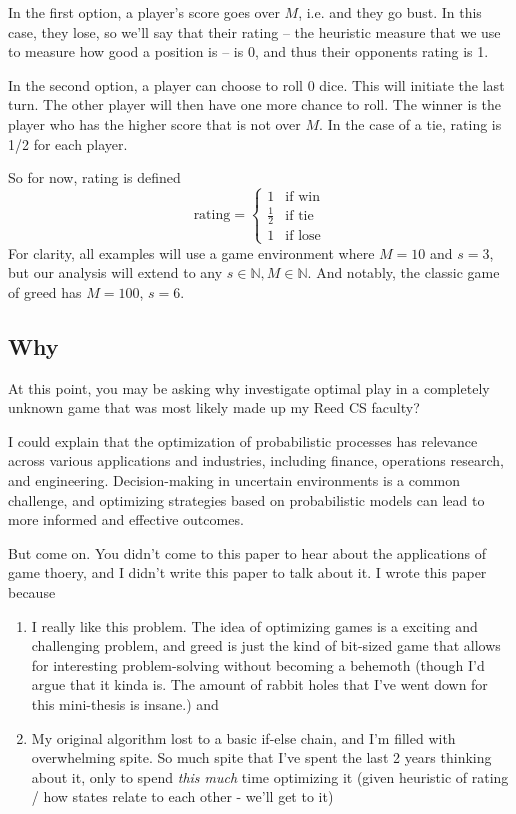 \documentclass[a4paper]{article}
\begin{document}
In the first option, a player's score goes over $M$, i.e. and they go bust. In this case, they lose, so we'll say that their rating -- the heuristic measure that we use to measure how good a position is -- is 0, and thus their opponents rating is 1. 

In the second option, a player can choose to roll 0 dice. This will initiate the last turn. The other player will then have one more chance to roll. The winner is the player who has the higher score that is not over $M$. In the case of a tie, rating is 1/2 for each player. 

So for now, rating is defined
%
$$
\text{rating} = \begin{cases}
	1 & \text{if win} \\
	\frac{1}{2} & \text{if tie} \\
	1 & \text{if lose} 
\end{cases}
$$
%
For clarity, all examples will use a game environment where $M = 10$ and $s = 3$, but our analysis will extend to any $s \in \mathbb{N}, M \in \mathbb{N}$. And notably, the classic game of greed has $M = 100$, $s = 6$.


\subsection{Why}

At this point, you may be asking why investigate optimal play in a completely unknown game that was most likely made up my Reed CS faculty? 

I could explain that the optimization of probabilistic processes has relevance across various applications and industries, including finance, operations research, and engineering. Decision-making in uncertain environments is a common challenge, and optimizing strategies based on probabilistic models can lead to more informed and effective outcomes.

But come on. You didn't come to this paper to hear about the applications of game thoery, and I didn't write this paper to talk about it. I wrote this paper because 

\begin{enumerate}
\item I really like this problem. The idea of optimizing games is a exciting and challenging problem, and greed is just the kind of bit-sized game that allows for interesting problem-solving without becoming a behemoth (though I'd argue that it kinda is. The amount of rabbit holes that I've went down for this mini-thesis is insane.) and

\item My original algorithm lost to a basic if-else chain, and I'm filled with overwhelming spite. So much spite that I've spent the last 2 years thinking about it, only to spend \textit{this much} time optimizing it (given heuristic of rating / how states relate to each other - we'll get to it) 
\end{enumerate}
\end{document}
